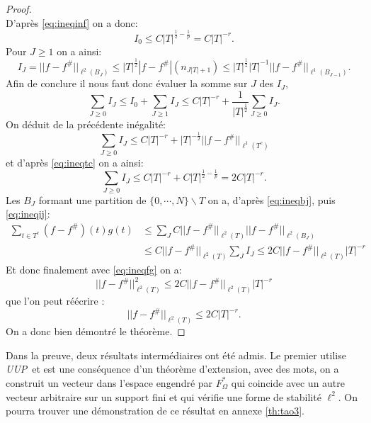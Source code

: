 \begin{proof}
\begin{equation}
	\end{equation}
	D'après \ref{eq:ineqinf} on a donc:
	\begin{equation}
		I_0 \leq C|T|^{\frac{1}{2} - \frac{1}{p}} = C|T|^{-r}.
	\end{equation}
	Pour $J\geq 1$ on a ainsi:
	\begin{equation}
		I_J =||f-f^\#||_{\ell^{2}(B_{J})} \leq |T|^\frac{1}{2}|f-f^\#|(n_{J|T|+1}) \leq |T|^\frac{1}{2} |T|^{-1} ||f-f^\#||_{\ell^1(B_{J-1})}.
	\end{equation}
	Afin de conclure il nous faut donc évaluer la somme sur $J$ des $I_J$,
	\begin{equation}\label{eq:ineqij}
		\sum_{J\geq 0} I_J \leq I_0 + \sum_{J\geq 1} I_J  \leq C|T|^{-r} +\frac{1}{|T|^{\frac{1}{2}}} \sum_{J\geq 0} I_J.
	\end{equation}
	On déduit de la précédente inégalité:
	\begin{equation}
		\sum_{J\geq 0} I_J \leq C|T|^{-r} + |T|^{-\frac{1}{2}} ||f-f^\#||_{\ell^1(T^c)}
	\end{equation}
	et d'après \ref{eq:ineqtc} on a ainsi:
	\begin{equation}
		\sum_{J\geq 0} I_J \leq C|T|^{-r} + C|T|^{\frac{1}{2} - \frac{1}{p}} = 2C|T|^{-r}.
	\end{equation}
	Les $B_J$ formant une partition de $\{0, \cdots, N\}\backslash T$ on a, d'après \ref{eq:ineqbj}, puis \ref{eq:ineqij}:
	\begin{align}
		\sum_{t \in T^c} (f-f^\#)(t)g(t)&\leq \sum_J C ||f-f^\#||_{\ell^2(T)}||f-f^\#||_{\ell^2(B_J)} \\
						&\leq C||f-f^\#||_{\ell^2(T)}\sum_J I_J \leq 2C||f-f^\#||_{\ell^2(T)}|T|^{-r}
	\end{align}
	Et donc finalement avec \ref{eq:ineqfg} on a:
	\begin{equation}
		||f-f^\#||_{\ell^2(T)}^2\leq 2C ||f-f^\#||_{\ell^2(T)}|T|^{-r}
	\end{equation}
	que l'on peut réécrire :
	\begin{equation}
		||f-f^\#||_{\ell^2(T)}\leq 2C|T|^{-r}.
	\end{equation}
	On a donc bien démontré le théorème.	
\end{proof}
Dans la preuve, deux résultats intermédiaires ont été admis. Le premier utilise \emph{UUP} et est une conséquence d'un théorème d'extension, avec des mots, on a construit un vecteur dans l'espace engendré par $F_\Omega^*$ qui coincide avec un autre vecteur arbitraire sur un support fini et qui vérifie une forme de stabilité $\ell^2$. On pourra trouver une démonstration de ce résultat en annexe \ref{th:tao3}.
